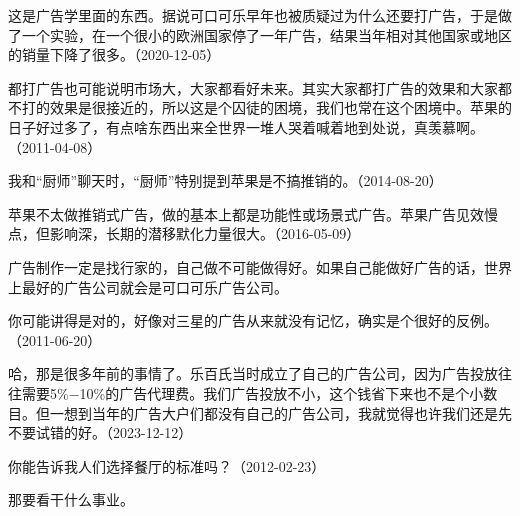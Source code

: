 
这是广告学里面的东西。据说可口可乐早年也被质疑过为什么还要打广告，于是做了一个实验，在一个很小的欧洲国家停了一年广告，结果当年相对其他国家或地区的销量下降了很多。（2020-12-05）


都打广告也可能说明市场大，大家都看好未来。其实大家都打广告的效果和大家都不打的效果是很接近的，所以这是个囚徒的困境，我们也常在这个困境中。苹果的日子好过多了，有点啥东西出来全世界一堆人哭着喊着地到处说，真羡慕啊。（2011-04-08）


我和“厨师”聊天时，“厨师”特别提到苹果是不搞推销的。（2014-08-20）


苹果不太做推销式广告，做的基本上都是功能性或场景式广告。苹果广告见效慢点，但影响深，长期的潜移默化力量很大。（2016-05-09）

广告制作一定是找行家的，自己做不可能做得好。如果自己能做好广告的话，世界上最好的广告公司就会是可口可乐广告公司。


你可能讲得是对的，好像对三星的广告从来就没有记忆，确实是个很好的反例。（2011-06-20）


哈，那是很多年前的事情了。乐百氏当时成立了自己的广告公司，因为广告投放往往需要5\%\( - \)10\%的广告代理费。我们广告投放不小，这个钱省下来也不是个小数目。但一想到当年的广告大户们都没有自己的广告公司，我就觉得也许我们还是先不要试错的好。（2023-12-12）


你能告诉我人们选择餐厅的标准吗？（2012-02-23）


那要看干什么事业。


